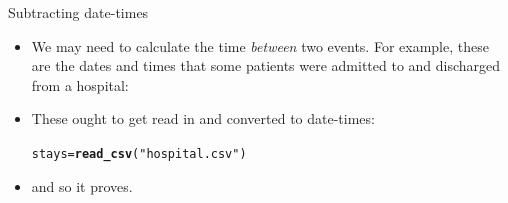 \documentclass[unknownkeysallowed]{beamer}\usepackage[]{graphicx}\usepackage[]{color}
\makeatletter
\newcommand{\hlstr}[1]{\textcolor[rgb]{0.192,0.494,0.8}{#1}}%
\newcommand{\hlstd}[1]{\textcolor[rgb]{0.345,0.345,0.345}{#1}}%
\newcommand{\hlkwb}[1]{\textcolor[rgb]{0.69,0.353,0.396}{#1}}%
\newcommand{\hlkwd}[1]{\textcolor[rgb]{0.737,0.353,0.396}{\textbf{#1}}}%
\newenvironment{kframe}{%
 \def\at@end@of@kframe{}%
 \ifinner\ifhmode%
  \def\at@end@of@kframe{\end{minipage}}%
  \begin{minipage}{\columnwidth}%
 \fi\fi%
 \def\FrameCommand##1{\hskip\@totalleftmargin \hskip-\fboxsep
 \colorbox{shadecolor}{##1}\hskip-\fboxsep
     \hskip-\linewidth \hskip-\@totalleftmargin \hskip\columnwidth}%
 \MakeFramed {\advance\hsize-\width
   \@totalleftmargin\z@ \linewidth\hsize
   \@setminipage}}%
 {\par\unskip\endMakeFramed%
 \at@end@of@kframe}
\newenvironment{knitrout}{}{} %
\makeatother
\begin{document}
\begin{frame}[fragile]{Subtracting date-times}
  
  \begin{itemize}
  \item We may need to calculate the time \emph{between} two
    events. For example, these are the dates and times that some
    patients were admitted to and discharged from a hospital:
    
    
    
    
  \item These ought to get read in and converted to date-times:
    
\begin{knitrout}
\color{fgcolor}\begin{kframe}
\begin{alltt}
\hlstd{stays}\hlkwb{=}\hlkwd{read_csv}\hlstd{(}\hlstr{"hospital.csv"}\hlstd{)}
\end{alltt}


{\ttfamily\noindent\itshape{}}\end{kframe}
\end{knitrout}
\item and so it proves.
    
  
\end{itemize}
  
\end{frame}
\end{document}
